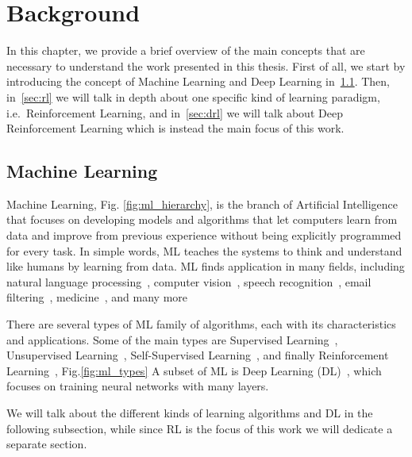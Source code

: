 
\chapter{Background}
\label{ch:background}
In this chapter, we provide a brief overview of the main concepts that are necessary to understand the work presented in this thesis.
First of all, we start by introducing the concept of Machine Learning and Deep Learning in~\ref{sec:machine_learning}.
Then, in~\ref{sec:rl} we will talk in depth about one specific kind of learning paradigm, i.e.\ Reinforcement Learning, and in~\ref{sec:drl} we will talk about Deep Reinforcement Learning which is instead the main focus of this work.

\section{Machine Learning}
\label{sec:machine_learning}

Machine Learning, Fig. \ref{fig:ml_hierarchy}, is the branch of Artificial Intelligence that focuses on developing models and algorithms that let computers learn from data and improve from previous experience without being explicitly programmed for every task.
In simple words, ML teaches the systems to think and understand like humans by learning from data.
ML finds application in many fields, including natural language processing~\citep{devlin2018bert}, computer vision~\citep{he2016deep}, speech recognition~\citep{hinton2012deep}, email filtering~\citep{carreras2001boosting}, medicine~\citep{esteva2017dermatologist}, and many more

There are several types of ML family of algorithms, each with its characteristics and applications.
Some of the main types are Supervised Learning~\citep{kotsiantis2007supervised}, Unsupervised Learning~\citep{hastie2009elements}, Self-Supervised Learning~\citep{balestriero2023cookbook}, and finally Reinforcement Learning~\citep{sutton1998introduction}, Fig.\ref{fig:ml_types}
A subset of ML is Deep Learning (DL)~\citep{lecun2015deep}, which focuses on training neural networks with many layers.

We will talk about the different kinds of learning algorithms and DL in the following subsection, while since RL is the focus of this work we will dedicate a separate section.




